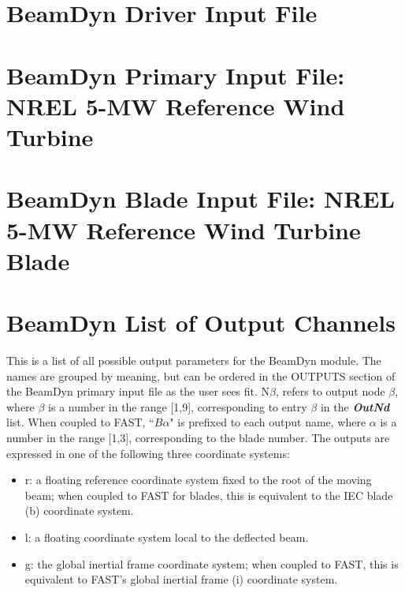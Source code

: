 \appendix
\chapter{BeamDyn Driver Input File}
\label{sec:AppDriver}



\chapter{BeamDyn Primary Input File: NREL 5-MW Reference Wind Turbine}
\label{sec:AppPrimary}


\chapter{BeamDyn Blade Input File: NREL 5-MW Reference Wind Turbine Blade}
\label{sec:AppBlade}


\chapter{BeamDyn List of Output Channels}
\label{sec:AppOutputChannel}
This is a list of all possible output parameters for the BeamDyn module.  The names are grouped by meaning, but can be ordered in the OUTPUTS section of the BeamDyn primary input file as the user sees fit.  N$\beta$, refers to output node $\beta$, where $\beta$ is a number in the range [1,9], corresponding to entry $\beta$ in the \textbf{\textit{OutNd}} list. When coupled to FAST, ``$B\alpha$" is prefixed to each output name, where $\alpha$ is a number in the range [1,3], corresponding to the blade number.  The outputs are expressed in one of the following three coordinate systems:
\begin{itemize}
    \item r: a floating reference coordinate system fixed to the root of the moving beam; when coupled to FAST for blades, this is equivalent to the IEC blade (b) coordinate system.
    \item l: a floating coordinate system local to the deflected beam.
    \item g: the global inertial frame coordinate system; when coupled to FAST, this is equivalent to FAST's global inertial frame (i) coordinate system.
\end{itemize}
